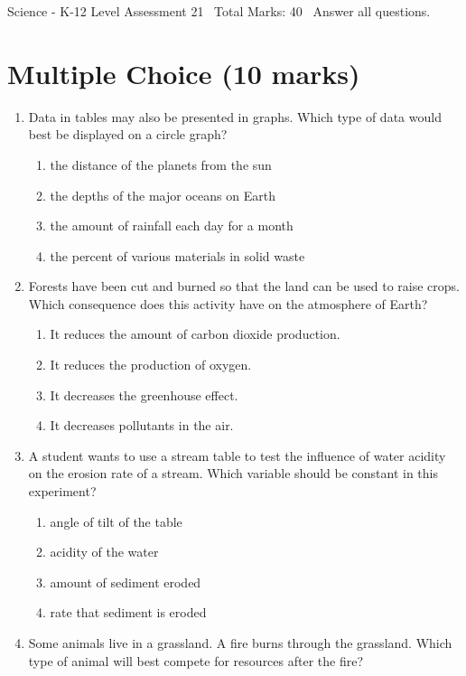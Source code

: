 \documentclass[12pt]{article}
\begin{document}
\begin{center}
Science - K-12 Level Assessment 21 \
Total Marks: 40 \
Answer all questions.
\end{center}

\section*{Multiple Choice (10 marks)}
\begin{enumerate}[label=\arabic*.]
\item Data in tables may also be presented in graphs. Which type of data would best be displayed on a circle graph?
\begin{enumerate}[label=(\alph*)]
    \item the distance of the planets from the sun
    \item the depths of the major oceans on Earth
    \item the amount of rainfall each day for a month
    \item the percent of various materials in solid waste
\end{enumerate}
\item Forests have been cut and burned so that the land can be used to raise crops. Which consequence does this activity have on the atmosphere of Earth?
\begin{enumerate}[label=(\alph*)]
    \item It reduces the amount of carbon dioxide production.
    \item It reduces the production of oxygen.
    \item It decreases the greenhouse effect.
    \item It decreases pollutants in the air.
\end{enumerate}
\item A student wants to use a stream table to test the influence of water acidity on the erosion rate of a stream. Which variable should be constant in this experiment?
\begin{enumerate}[label=(\alph*)]
    \item angle of tilt of the table
    \item acidity of the water
    \item amount of sediment eroded
    \item rate that sediment is eroded
\end{enumerate}
\item Some animals live in a grassland. A fire burns through the grassland. Which type of animal will best compete for resources after the fire?

\end{enumerate}
\end{document}
